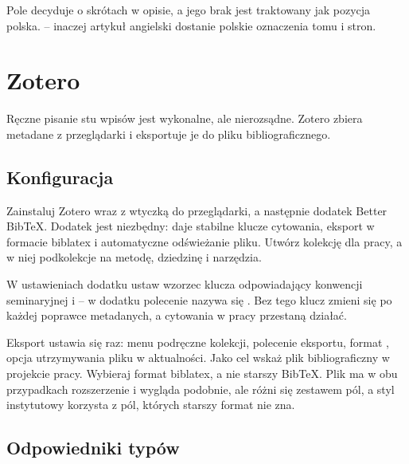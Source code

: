 Pole  decyduje o skrótach w opisie, a jego brak jest traktowany jak pozycja polska.  -- inaczej artykuł angielski dostanie polskie oznaczenia tomu i stron.

\section{Zotero}

Ręczne pisanie stu wpisów jest wykonalne, ale nierozsądne. Zotero zbiera metadane z przeglądarki i eksportuje je do pliku bibliograficznego.

\subsection{Konfiguracja}

Zainstaluj Zotero wraz z wtyczką do przeglądarki, a następnie dodatek Better BibTeX. Dodatek jest niezbędny: daje stabilne klucze cytowania, eksport w formacie biblatex i automatyczne odświeżanie pliku. Utwórz kolekcję dla pracy, a w niej podkolekcje na metodę, dziedzinę i narzędzia.

W ustawieniach dodatku ustaw wzorzec klucza odpowiadający konwencji seminaryjnej i  -- w dodatku polecenie nazywa się . Bez tego klucz zmieni się po każdej poprawce metadanych, a cytowania w pracy przestaną działać.

Eksport ustawia się raz: menu podręczne kolekcji, polecenie eksportu, format , opcja utrzymywania pliku w aktualności. Jako cel wskaż plik bibliograficzny w projekcie pracy. Wybieraj format biblatex, a nie starszy BibTeX. Plik ma w obu przypadkach rozszerzenie  i wygląda podobnie, ale różni się zestawem pól, a styl instytutowy korzysta z pól, których starszy format nie zna.

\subsection{Odpowiedniki typów}

